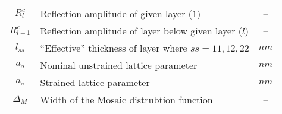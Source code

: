 \begin{table}
\begin{longtable}{|c|l|c|}
$R^c_l$         & Reflection amplitude of given layer ($1$) &--\\
$R^c_{l-1}$       & Reflection amplitude of layer below given layer ($l$) & --\\
$l_{ss}$        & ``Effective'' thickness of layer where $ss = 11,12,22$ & $nm$\\
$a_o$          & Nominal unstrained lattice parameter & $nm$\\
$a_s$          & Strained lattice parameter  & $nm$ \\
$\Delta_M$ & Width of the Mosaic distrubtion function  & --\\
\hline
\end{longtable}
\end{table}



%	
	
%	
%	


